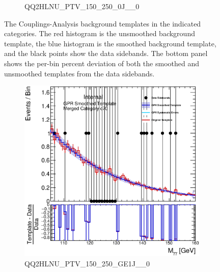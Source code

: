 \begin{figure}
\begin{center}
\begin{subfigure}[T]{0.49\linewidth}
	\caption{QQ2HLNU\_PTV\_150\_250\_0J\_\_0}
\end{subfigure}
\caption{The Couplings-Analysis background templates in the indicated categories. The red histogram is the unsmoothed background template, the blue histogram is the smoothed background template, and the black points show the data sidebands. The bottom panel shows the per-bin percent deviation of both the smoothed and unsmoothed templates from the data sidebands. }
 \label{fig:gpr_coupcat_17}
 \end{center}
\end{figure}

\begin{figure}
\begin{center}
\begin{subfigure}[T]{0.49\linewidth}
	\centering
	\includegraphics[width=\linewidth]{figures/background/gpr/coupCatTemplates/GPR_Smoothed_Plot_hmgg_c70.eps}
	\caption{QQ2HLNU\_PTV\_150\_250\_GE1J\_\_0}
\end{subfigure}
\begin{subfigure}[T]{0.49\linewidth}
	\centering

\end{subfigure}
\end{center}
\end{figure}
